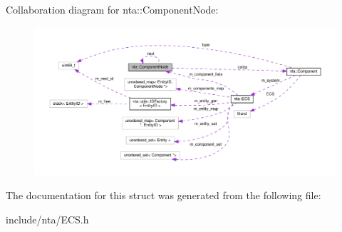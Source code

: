 Collaboration diagram for nta\+:\+:Component\+Node\+:\nopagebreak
\begin{figure}[H]
\begin{center}
\leavevmode
\includegraphics[width=350pt]{dc/ddc/structnta_1_1ComponentNode__coll__graph}
\end{center}
\end{figure}


The documentation for this struct was generated from the following file\+:\begin{DoxyCompactItemize}
\item 
include/nta/E\+C\+S.\+h\end{DoxyCompactItemize}
